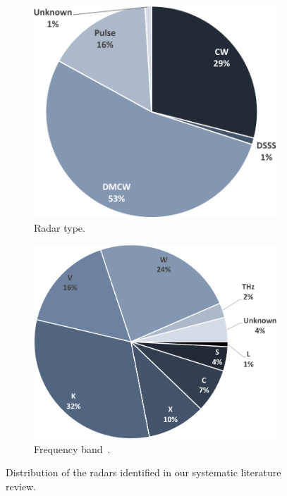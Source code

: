 \begin{figure}[t]
    \begin{subfigure}{.49\textwidth}
        \centering
        \includegraphics[height=.75\linewidth]{Figures/StateOfTheArt/Radar/radar-types.pdf}
        \captionsetup{width=.9\linewidth}
        \caption{Radar type.}
        \label{fig:state_of_the_art:radar:types}
    \end{subfigure}
    \begin{subfigure}{.49\textwidth}
        \centering
        \includegraphics[height=.75\linewidth]{Figures/StateOfTheArt/Radar/radar-frequencies.pdf}  
        \captionsetup{width=.9\linewidth}
        \caption{Frequency band~\cite{IEEE:2020}.}
        \label{fig:state_of_the_art:radar:frequencies}
    \end{subfigure}
    \caption{Distribution of the radars identified in our systematic literature review.}
    \label{fig:state_of_the_art:radar:pie-charts}
\end{figure}

